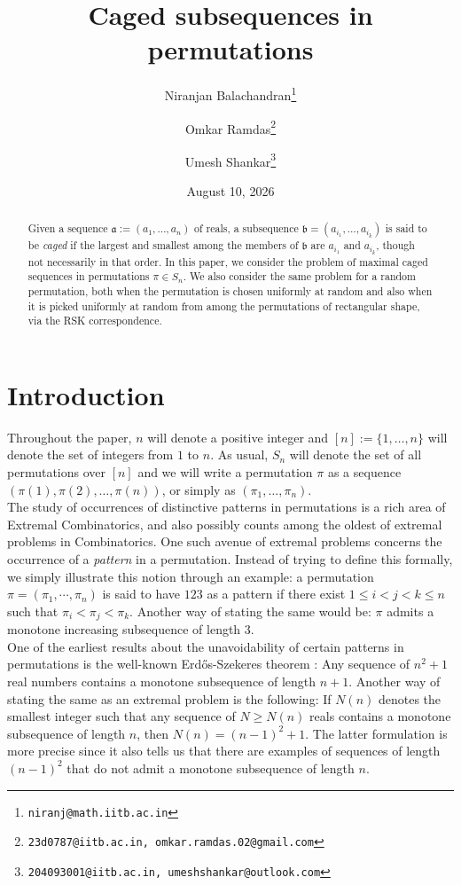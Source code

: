 \documentclass[11pt, a4paper]{article}
\title{Caged subsequences in permutations}
\author[1]{Niranjan Balachandran\thanks{\tt{niranj@math.iitb.ac.in}}}
\author[2]{Omkar Ramdas\thanks{\tt{23d0787@iitb.ac.in, omkar.ramdas.02@gmail.com}}}
\author[3]{Umesh Shankar\thanks{\tt{204093001@iitb.ac.in, umeshshankar@outlook.com}}}
\affil[1,2]{Department of Mathematics, Indian Institute of Technology Bombay, Powai, Mumbai 400076, India}
\affil[3]{Department of Computer Science and Automation, Indian Institute of Science Bengaluru, Bengaluru 560012, India}
\date{August 10, 2026}
\theoremstyle{compact}
\begin{document}
\maketitle
\begin{abstract}
Given a sequence $\mathfrak{a}:=(a_1,\ldots,a_n)$ of reals, a subsequence $\mathfrak{b}=(a_{i_1},\ldots,a_{i_k})$ is said to be \emph{caged} if the largest and smallest among the members of $\mathfrak{b}$ are $a_{i_1}$ and $a_{i_k}$, though not necessarily in that order. In this paper, we consider the problem of maximal caged sequences in  permutations $\pi\in S_n$. We also consider the same problem for a random permutation, both when the permutation is chosen uniformly at random and also when it is picked uniformly at random from among the permutations of rectangular shape, via the RSK correspondence.  
\end{abstract}

\section{Introduction}
Throughout the paper, $n$ will denote a positive integer and $[n]:=\{1,\ldots,n\}$ will denote the set of integers from $1$ to $n$. As usual, $S_n$ will denote the set of all permutations over $[n]$ and we will write a permutation $\pi$ as a sequence $(\pi(1), \pi(2), \dots, \pi(n))$, or simply as $(\pi_1,\ldots,\pi_n)$.\\

The study of occurrences of distinctive patterns in permutations is a rich area of Extremal Combinatorics, and also possibly counts among the oldest of extremal problems in Combinatorics. One such avenue of extremal problems concerns the occurrence of a \textit{pattern} in a permutation. Instead of trying to define this formally, we simply illustrate this notion through an example: a permutation $\pi=(\pi_1,\cdots,\pi_n)$ is said to have $123$ as a pattern if there exist $1\le i<j<k\le n$ such that $\pi_i<\pi_j<\pi_k$. Another way of stating the same would be: $\pi$ admits a monotone increasing subsequence of length $3$.\\

One of the earliest results about the unavoidability of certain patterns in permutations is the well-known Erd\H{o}s-Szekeres theorem \cite{ES}: Any sequence of $n^2+1$ real numbers contains a monotone subsequence of length $n+1$. Another way of stating the same as an extremal problem is the following: If $N(n)$ denotes the smallest integer such that any sequence of $N\ge N(n)$ reals contains a monotone subsequence of length $n$, then $N(n)=(n-1)^2+1$. The latter formulation is more precise since it also tells us that there are examples of sequences of length $(n-1)^2$ that do not admit a monotone subsequence of length $n$.\\
\end{document}
